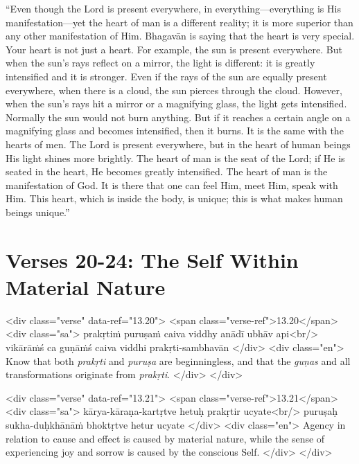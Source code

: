 \enquote{Even though the Lord is present everywhere, in everything---everything is His manifestation---yet the heart of man is a different reality; it is more superior than any other manifestation of Him. Bhagavān is saying that the heart is very special. Your heart is not just a heart. For example, the sun is present everywhere. But when the sun’s rays reflect on a mirror, the light is different: it is greatly intensified and it is stronger. Even if the rays of the sun are equally present everywhere, when there is a cloud, the sun pierces through the cloud. However, when the sun’s rays hit a mirror or a magnifying glass, the light gets intensified. Normally the sun would not burn anything. But if it reaches a certain angle on a magnifying glass and becomes intensified, then it burns. It is the same with the hearts of men. The Lord is present everywhere, but in the heart of human beings His light shines more brightly. The heart of man is the seat of the Lord; if He is seated in the heart, He becomes greatly intensified. The heart of man is the manifestation of God. It is there that one can feel Him, meet Him, speak with Him. This heart, which is inside the body, is unique; this is what makes human beings unique.}

\section{Verses 20-24: The Self Within Material Nature}\label{sec-verses-20-24-the-self-within-material-nature}


\begin{html}
<div class="verse" data-ref="13.20">
  <span class="verse-ref">13.20</span>
  <div class="sa">
    prakṛtiṁ puruṣaṁ caiva viddhy anādī ubhāv api<br/>
    vikārāṁś ca guṇāṁś caiva viddhi prakṛti-sambhavān
  </div>
  <div class="en">
    Know that both \textit{prakṛti} and \textit{puruṣa} are beginningless, and that the \textit{guṇas} and all transformations originate from \textit{prakṛti}.
  </div>
</div>
\end{html}



\begin{html}
<div class="verse" data-ref="13.21">
  <span class="verse-ref">13.21</span>
  <div class="sa">
    kārya-kāraṇa-kartṛtve hetuḥ prakṛtir ucyate<br/>
    puruṣaḥ sukha-duḥkhānāṁ bhoktṛtve hetur ucyate
  </div>
  <div class="en">
    Agency in relation to cause and effect is caused by material nature, while the sense of experiencing joy and sorrow is caused by the conscious Self.
  </div>
</div>
\end{html}



